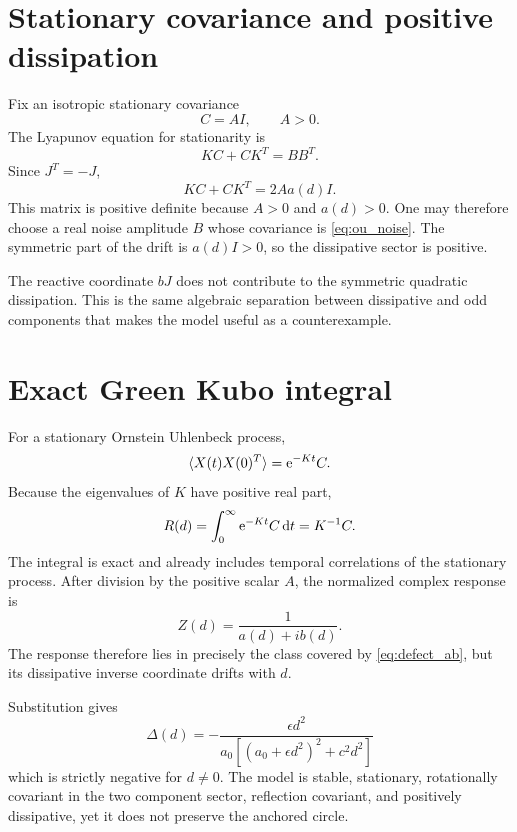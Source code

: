 \section{Stationary covariance and positive dissipation}
Fix an isotropic stationary covariance
\begin{equation}
 C=A I,
 \qquad A>0.
 \label{eq:ou_cov}
\end{equation}
The Lyapunov equation for stationarity is
\begin{equation}
 K C+C K^{T}=B B^{T}.
 \label{eq:ou_lyapunov}
\end{equation}
Since $J^T=-J$,
\begin{equation}
 K C+C K^{T}=2Aa(d)I.
 \label{eq:ou_noise}
\end{equation}
This matrix is positive definite because $A>0$ and $a(d)>0$. One may therefore choose a real noise amplitude $B$ whose covariance is \cref{eq:ou_noise}. The symmetric part of the drift is $a(d)I>0$, so the dissipative sector is positive.

The reactive coordinate $bJ$ does not contribute to the symmetric quadratic dissipation. This is the same algebraic separation between dissipative and odd components that makes the model useful as a counterexample.

\section{Exact Green Kubo integral}
For a stationary Ornstein Uhlenbeck process,
\begin{equation}
 \langle X(t)X(0)^T\rangle=\mathrm{e}^{-K t}C.
 \label{eq:ou_correlation}
\end{equation}
Because the eigenvalues of $K$ have positive real part,
\begin{equation}
 R(d)=\int_0^\infty\mathrm{e}^{-K t}C\,\mathrm{d} t
 =K^{-1}C.
 \label{eq:ou_gk}
\end{equation}
The integral is exact and already includes temporal correlations of the stationary process. After division by the positive scalar $A$, the normalized complex response is
\begin{equation}
 Z(d)=\frac{1}{a(d)+i b(d)}.
 \label{eq:ou_z}
\end{equation}
The response therefore lies in precisely the class covered by \cref{eq:defect_ab}, but its dissipative inverse coordinate drifts with $d$.

Substitution gives
\begin{equation}
 \boxed{
 \Delta(d)=
 -\frac{\epsilon d^2}
 {a_0\left[(a_0+\epsilon d^2)^2+c^2d^2\right]}}
 \label{eq:ou_defect}
\end{equation}
which is strictly negative for $d\ne0$. The model is stable, stationary, rotationally covariant in the two component sector, reflection covariant, and positively dissipative, yet it does not preserve the anchored circle.


